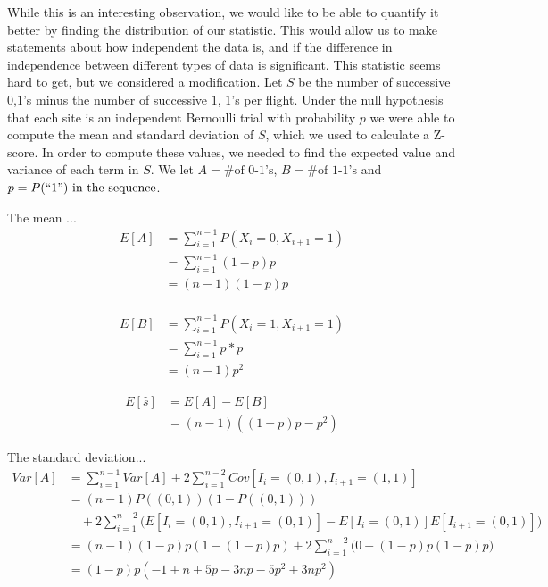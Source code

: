 \documentclass{article}
\begin{document}
	While this is an interesting observation, we would like to be able to 
quantify it better by finding the distribution of our statistic.  This would 
allow us to make statements about how independent the data is, and if the 
difference in independence between different types of data is significant.   
This statistic seems hard to get, but we considered a modification.  Let \(S\) 
be the number of successive \(0\),\(1\)'s minus the number of successive \(1\),
\(1\)'s per flight.  Under the null hypothesis that each site is an independent 
Bernoulli trial with probability \(p\) we were able to compute the mean and 
standard deviation of \(S\), which we used to calculate a Z-score.
	In order to compute these values, we needed to find the expected value and
variance of each term in \(S\).  We let \(A = \text{\# of 0-1's}\), 
\(B = \text{\# of 1-1's}\) and \(p = P(``1")\text{ in the sequence}\).

	The mean ...
    \begin{equation*}
        \begin{split}
        E[A]& =\sum_{i=1}^{n-1}P(X_i=0,X_{i+1}=1) \\
            & =\sum_{i=1}^{n-1}(1-p)p \\
            & =(n-1)(1-p)p \\
        \end{split}
    \end{equation*}

    \begin{equation*}
        \begin{split}
        E[B]& =\sum_{i=1}^{n-1}P(X_i=1,X_{i+1}=1) \\
            & =\sum_{i=1}^{n-1}p*p \\
            & =(n-1)p^2
        \end{split}
    \end{equation*}

    \begin{equation*}
        \begin{split}
        E[\hat{s}]& =E[A]-E[B] \\
                  & =(n-1)\left((1-p)p-p^2\right)
        \end{split}
    \end{equation*}

	The standard deviation...
    \begin{equation*}
        \begin{split}
        Var[A]& =\sum_{i=1}^{n-1}Var[A]+2\sum_{i=1}^{n-2}Cov[I_i=(0,1),I_{i+1}=
                 (1,1)] \\
              & =(n-1)P((0,1))(1-P((0,1))) \\
              & \quad +2\sum_{i=1}^{n-2}\bigg(E[I_i=(0,1),I_{i+1}=(0,1)]-E[I_i=
                (0,1)]E[I_{i+1}=(0,1)]\bigg) \\
              & =(n-1)(1-p)p(1-(1-p)p)+2\sum_{i=1}^{n-2}\bigg(0-(1-p)p(1-p)p
                \bigg) \\
              & =(1-p)p(-1+n+5p-3np-5p^2+3np^2)
        \end{split}
    \end{equation*}
\end{document}
